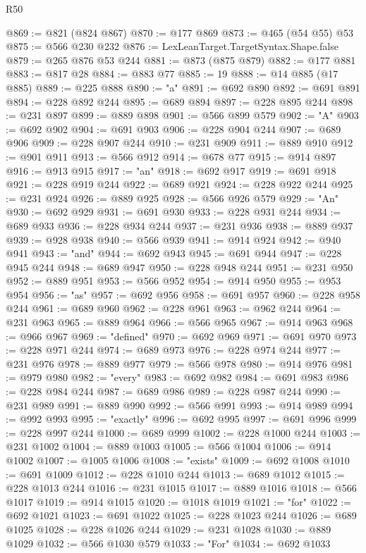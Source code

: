 \begin{lexlean}{R50}
\begin{coremodule}
@869 := @821 (@824 @867)
@870 := @177 @869
@873 := @465 (@54 @55) @53
@875 := @566 @230 @232
@876 := LexLeanTarget.TargetSyntax.Shape.false
@879 := @265 @876 @53 @244
@881 := @873 (@875 @879)
@882 := @177 @881
@883 := @817 @28
@884 := @883 @77
@885 := 19
@888 := @14 @885 (@17 @885)
@889 := @225 @888
@890 := "a"
@891 := @692 @890
@892 := @691 @891
@894 := @228 @892 @244
@895 := @689 @894
@897 := @228 @895 @244
@898 := @231 @897
@899 := @889 @898
@901 := @566 @899 @579
@902 := "A"
@903 := @692 @902
@904 := @691 @903
@906 := @228 @904 @244
@907 := @689 @906
@909 := @228 @907 @244
@910 := @231 @909
@911 := @889 @910
@912 := @901 @911
@913 := @566 @912
@914 := @678 @77
@915 := @914 @897
@916 := @913 @915
@917 := "an"
@918 := @692 @917
@919 := @691 @918
@921 := @228 @919 @244
@922 := @689 @921
@924 := @228 @922 @244
@925 := @231 @924
@926 := @889 @925
@928 := @566 @926 @579
@929 := "An"
@930 := @692 @929
@931 := @691 @930
@933 := @228 @931 @244
@934 := @689 @933
@936 := @228 @934 @244
@937 := @231 @936
@938 := @889 @937
@939 := @928 @938
@940 := @566 @939
@941 := @914 @924
@942 := @940 @941
@943 := "and"
@944 := @692 @943
@945 := @691 @944
@947 := @228 @945 @244
@948 := @689 @947
@950 := @228 @948 @244
@951 := @231 @950
@952 := @889 @951
@953 := @566 @952
@954 := @914 @950
@955 := @953 @954
@956 := "as"
@957 := @692 @956
@958 := @691 @957
@960 := @228 @958 @244
@961 := @689 @960
@962 := @228 @961
@963 := @962 @244
@964 := @231 @963
@965 := @889 @964
@966 := @566 @965
@967 := @914 @963
@968 := @966 @967
@969 := "defined"
@970 := @692 @969
@971 := @691 @970
@973 := @228 @971 @244
@974 := @689 @973
@976 := @228 @974 @244
@977 := @231 @976
@978 := @889 @977
@979 := @566 @978
@980 := @914 @976
@981 := @979 @980
@982 := "every"
@983 := @692 @982
@984 := @691 @983
@986 := @228 @984 @244
@987 := @689 @986
@989 := @228 @987 @244
@990 := @231 @989
@991 := @889 @990
@992 := @566 @991
@993 := @914 @989
@994 := @992 @993
@995 := "exactly"
@996 := @692 @995
@997 := @691 @996
@999 := @228 @997 @244
@1000 := @689 @999
@1002 := @228 @1000 @244
@1003 := @231 @1002
@1004 := @889 @1003
@1005 := @566 @1004
@1006 := @914 @1002
@1007 := @1005 @1006
@1008 := "exists"
@1009 := @692 @1008
@1010 := @691 @1009
@1012 := @228 @1010 @244
@1013 := @689 @1012
@1015 := @228 @1013 @244
@1016 := @231 @1015
@1017 := @889 @1016
@1018 := @566 @1017
@1019 := @914 @1015
@1020 := @1018 @1019
@1021 := "for"
@1022 := @692 @1021
@1023 := @691 @1022
@1025 := @228 @1023 @244
@1026 := @689 @1025
@1028 := @228 @1026 @244
@1029 := @231 @1028
@1030 := @889 @1029
@1032 := @566 @1030 @579
@1033 := "For"
@1034 := @692 @1033

\end{coremodule}
\end{lexlean}
